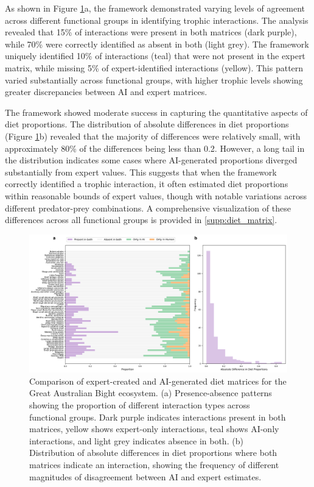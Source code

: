 As shown in Figure \ref{fig:gab_comparison}a, the framework demonstrated varying levels of agreement across different functional groups in identifying trophic interactions. The analysis revealed that 15\% of interactions were present in both matrices (dark purple), while 70\% were correctly identified as absent in both (light grey). The framework uniquely identified 10\% of interactions (teal) that were not present in the expert matrix, while missing 5\% of expert-identified interactions (yellow). This pattern varied substantially across functional groups, with higher trophic levels showing greater discrepancies between AI and expert matrices.

The framework showed moderate success in capturing the quantitative aspects of diet proportions. The distribution of absolute differences in diet proportions (Figure \ref{fig:gab_comparison}b) revealed that the majority of differences were relatively small, with approximately 80\% of the differences being less than 0.2. However, a long tail in the distribution indicates some cases where AI-generated proportions diverged substantially from expert values. This suggests that when the framework correctly identified a trophic interaction, it often estimated diet proportions within reasonable bounds of expert values, though with notable variations across different predator-prey combinations. A comprehensive visualization of these differences across all functional groups is provided in \ref{supp:diet_matrix}.

\begin{landscape}
\begin{figure}[htbp]
    \centering
    \includegraphics[width=1.2\paperwidth]{figures/diet_matrix_validation/simplified_comparison.png}
    \caption{Comparison of expert-created and AI-generated diet matrices for the Great Australian Bight ecosystem. (a) Presence-absence patterns showing the proportion of different interaction types across functional groups. Dark purple indicates interactions present in both matrices, yellow shows expert-only interactions, teal shows AI-only interactions, and light grey indicates absence in both. (b) Distribution of absolute differences in diet proportions where both matrices indicate an interaction, showing the frequency of different magnitudes of disagreement between AI and expert estimates.}
    \label{fig:gab_comparison}
\end{figure}
\end{landscape}

